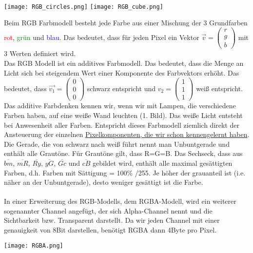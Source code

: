 \texttt{[image: RGB\_circles.png]}
\texttt{[image: RGB\_cube.png]}

Beim RGB Farbmodell besteht jede Farbe aus einer Mischung der 3 Grundfarben \textcolor{red}{rot}, \textcolor{green}{grün} und \textcolor{blue}{blau}. Das bedeutet, dass für jeden Pixel ein Vektor $\vec{v} = \left(\begin{smallmatrix}r \\ g \\ b \end{smallmatrix}\right)$ mit 3 Werten definiert wird.\\
Das RGB Modell ist ein additives Farbmodell. Das bedeutet, dass die Menge an Licht sich bei steigendem Wert einer Komponente des Farbvektors erhöht. Das bedeutet, dass $\vec{v_1} = \left(\begin{smallmatrix}0 \\ 0 \\ 0 \end{smallmatrix}\right)$ schwarz entspricht und ${v_2} = \left(\begin{smallmatrix}1 \\ 1 \\ 1 \end{smallmatrix}\right)$ weiß entspricht.\\
Das additive Farbdenken kennen wir, wenn wir mit Lampen, die verschiedene Farben haben, auf eine weiße Wand leuchten (1. Bild). Das weiße Licht entsteht bei Anwesenheit aller Farben. Entspricht dieses Farbmodell ziemlich direkt der Ansteuerung der einzelnen \hyperref[sec:pixel]{Pixelkomponenten, die wir schon kennengelernt haben}.\\
Die Gerade, die von schwarz nach weiß führt nennt man Unbuntgerade und enthält alle Grautöne. Für Grautöne gilt, dass R=G=B. Das Sechseck, dass aus $\overline{bm}$, $\overline{mR}$, $\overline{Ry}$, $\overline{yG}$, $\overline{Gc}$ und $\overline{cB}$ gebildet wird, enthält alle maximal gesättigten Farben, d.h. Farben mit Sättigung = 100\% \slash 255. Je höher der grauanteil ist (i.e. näher an der Unbuntgerade), desto weniger gesättigt ist die Farbe.\\
\\
In einer Erweiterung des RGB-Modells, dem RGBA-Modell, wird ein weiterer sogenannter Channel angefügt, der sich Alpha-Channel nennt und die Sichtbarkeit bzw. Transparent darstellt. Da wir jeden Channel mit einer genauigkeit von 8Bit darstellen, benötigt RGBA dann 4Byte pro Pixel.

\texttt{[image: RGBA.png]}


